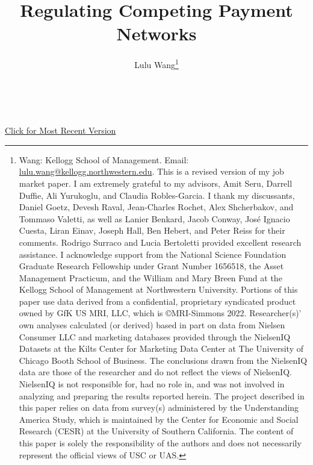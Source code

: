 \documentclass[12pt]{article}
\date{\monthname~\the\year}
\begin{document}
\title{Regulating Competing Payment Networks}
\author{Lulu Wang\thanks{Wang: Kellogg School of Management.
Email: \href{mailto:lulu.wang@kellogg.northwestern.edu}{lulu.wang@kellogg.northwestern.edu}.
This is a revised version of my job market paper.
I am extremely grateful to my advisors, Amit Seru, Darrell Duffie, Ali Yurukoglu, and Claudia Robles-Garcia.
I thank my discussants, Daniel Goetz, Devesh Raval, Jean-Charles Rochet, Alex Shcherbakov, and Tommaso Valetti, as well as Lanier Benkard, Jacob Conway, Jos\'e Ignacio Cuesta, Liran Einav, Joseph Hall, Ben Hebert, and Peter Reiss for their comments.
Rodrigo Surraco and Lucia Bertoletti provided excellent research assistance.
I acknowledge support from the National Science Foundation Graduate Research Fellowship under Grant Number 1656518, the Asset Management Practicum, and the William and Mary Breen Fund at the Kellogg School of Management at Northwestern University.
Portions of this paper use data derived from a confidential, proprietary syndicated product owned by GfK US MRI, LLC, which is \copyright MRI-Simmons 2022.
Researcher(s)' own analyses calculated (or derived) based in part on data from Nielsen Consumer LLC and marketing databases provided through the NielsenIQ Datasets at the Kilts Center for Marketing Data Center at The University of Chicago Booth School of Business.
The conclusions drawn from the NielsenIQ data are those of the researcher and do not reflect the views of NielsenIQ.
NielsenIQ is not responsible for, had no role in, and was not involved in analyzing and preparing the results reported herein.
The project described in this paper relies on data from survey(s) administered by the Understanding America Study, which is maintained by the Center for Economic and Social Research (CESR) at the University of Southern California. 
The content of this paper is solely the responsibility of the authors and does not necessarily represent the official views of USC or UAS.}}

\begin{NoHyper}
\maketitle
\end{NoHyper}

\begin{center}
\href{https://luluywang.github.io/PaperRepository/payment_jmp.pdf}{Click for Most Recent Version}

\end{center}
\end{document}
